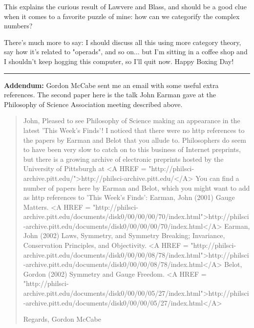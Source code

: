 This explains the curious result of Lawvere and Blass, and
should be a good clue when it comes to a favorite puzzle of
mine: how can we categorify the complex numbers?

There's much more to say: I should discuss all this using more 
category theory, say how it's related to "operads", and so on...
but I'm sitting in a coffee shop and I shouldn't keep hogging
this computer, so I'll quit now.   Happy Boxing Day!

\par\noindent\rule{\textwidth}{0.4pt}
\textbf{Addendum:} Gordon McCabe sent me an email with some useful
extra references.  The second paper here is the talk John Earman 
gave at the Philosophy of Science Association meeting described above.

\begin{quote}
John,
Pleased to see Philosophy of Science making an appearance in the latest
'This Week's Finds'!
I noticed that there were no http references to the papers by Earman and
Belot that you allude to. Philosophers do seem to have been very slow to
catch on to this business of Internet preprints, but there is a growing
archive of electronic preprints hosted by the University of Pittsburgh at
<A HREF = "http://philsci-archive.pitt.edu/">http://philsci-archive.pitt.edu/</A>
    You can find a number of papers here by
Earman and Belot, which you might want to add as http references to 'This
Week's Finds':
Earman, John (2001) Gauge Matters.
<A HREF = "http://philsci-archive.pitt.edu/documents/disk0/00/00/00/70/index.html">http://philsci-archive.pitt.edu/documents/disk0/00/00/00/70/index.html</A>
Earman, John (2002) Laws, Symmetry, and Symmetry Breaking; Invariance,
Conservation Principles, and Objectivity.
<A HREF = "http://philsci-archive.pitt.edu/documents/disk0/00/00/08/78/index.html">http://philsci-archive.pitt.edu/documents/disk0/00/00/08/78/index.html</A>
Belot, Gordon (2002) Symmetry and Gauge Freedom.
<A HREF = "http://philsci-archive.pitt.edu/documents/disk0/00/00/05/27/index.html">http://philsci-archive.pitt.edu/documents/disk0/00/00/05/27/index.html</A>

Regards,
Gordon McCabe
\end{quote}
    



